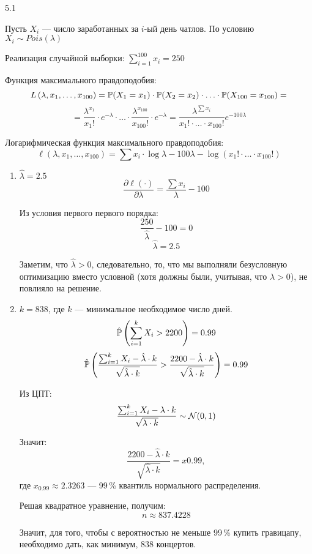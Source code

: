 \protect \hypertarget {soln:5.1}{}
\begin{solution}{{5.1}}

Пусть \(X_i\) — число заработанных за \(i\)-ый день чатлов. По условию \(X_i \sim Pois (\lambda) \)

Реализация случайной выборки: \(\sum_{i = 1}^{100} x_i = 250 \)

Функция максимального правдоподобия:
\[  L\left(\lambda, x_1, \ldots, x_{100}\right) = \P (X_1 = x_1) \cdot \P (X_2 = x_2) \cdot \ldots \cdot \P (X_{100} = x_{100} )= \]
\[ =\frac{\lambda^{x_1}}{x_1 !} \cdot e^{-\lambda} \cdot \ldots \cdot \frac{\lambda^{x_{100}}}{x_{100}!} \cdot e^{-\lambda} = \frac{\lambda^{\sum x_i}}{x_1!\cdot \ldots \cdot x_{100}!} e^{-100\lambda}\]

Логарифмическая функция максимального правдоподобия:
\[ \ell\left(\lambda, x_1, \ldots, x_{100} \right) = \sum x_i \cdot \log \lambda - 100 \lambda - \log \left(x_1!\cdot \ldots \cdot x_{100}! \right)\]

\begin{enumerate}
\item \( \hat{\lambda} = 2.5\)
\[ \frac{\partial \ell (\cdot)}{\partial \lambda} = \frac{\sum x_i}{\lambda} - 100\]

Из условия первого первого порядка:
\[ \frac{250}{\hat{\lambda}} - 100 = 0\]
\[ \hat{\lambda} = 2.5\]

Заметим, что \( \hat{\lambda} >0 \), следовательно, то, что мы выполняли безусловную оптимизацию вместо условной (хотя должны были, учитывая, что \(\lambda > 0\)), не повлияло на решение.


\item \(k = 838 \), где \(k\) — минимальное необходимое число дней.
\[ \hat{\P} \left(\sum_{i = 1}^k X_i >2200 \right) = 0.99\]
\[ \hat{\P} \left(\frac{\sum_{i = 1}^k X_i - \hat{\lambda} \cdot k}{\sqrt{ \hat{\lambda} \cdot k}}>\frac{2200 - \hat{\lambda} \cdot k}{\sqrt{ \hat{\lambda} \cdot k}}   \right) = 0.99\]

Из ЦПТ:
\[ \frac{\sum_{i = 1}^k X_i - \lambda \cdot k}{\sqrt{ \lambda \cdot k}} \sim \cN (0, 1)\]

Значит:
\[ \frac{2200 - \hat{\lambda} \cdot k}{\sqrt{ \hat{\lambda} \cdot k}} = x{0.99},\]
где \(x_{0.99} \approx 2.3263\) — 99\,\% квантиль нормального распределения.

Решая квадратное уравнение, получим:
\[ n \approx 837.4228\]

Значит, для того, чтобы с вероятностью не меньше 99\,\% купить гравицапу, необходимо дать, как минимум, 838 концертов.


\end{enumerate}
\end{solution}
